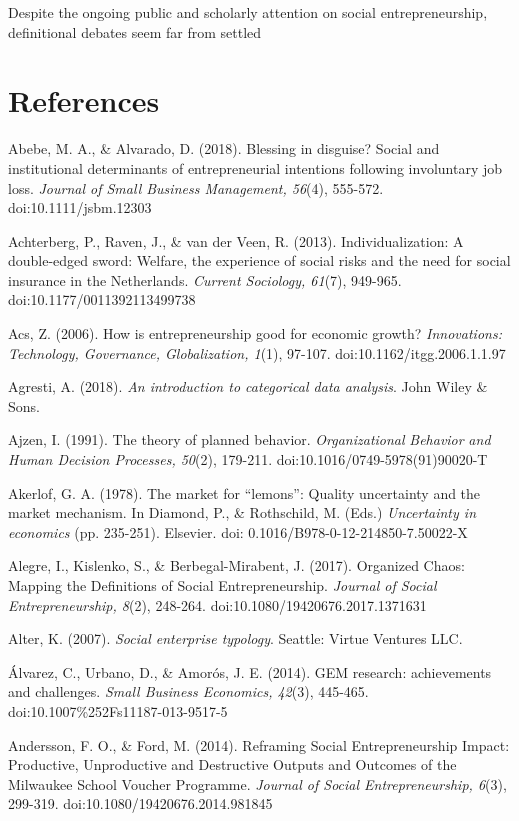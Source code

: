 \documentclass{article}
\begin{document}
  Despite the ongoing public and scholarly attention on social entrepreneurship, definitional debates seem far from settled \parencite{Saebi2019, Mair2010, Choi2014, Saebi2019, Alegre2017}



\section{References}



Abebe, M. A., \& Alvarado, D. (2018). Blessing in disguise? Social and institutional determinants of entrepreneurial intentions following involuntary job loss. \emph{Journal of Small Business Management, 56}(4), 555-572. doi:10.1111/jsbm.12303

Achterberg, P., Raven, J., \& van der Veen, R. (2013). Individualization: A double-edged sword: Welfare, the experience of social risks and the need for social insurance in the Netherlands. \emph{Current Sociology, 61}(7), 949-965. doi:10.1177/0011392113499738

Acs, Z. (2006). How is entrepreneurship good for economic growth? \emph{Innovations: Technology, Governance, Globalization, 1}(1), 97-107. doi:10.1162/itgg.2006.1.1.97

Agresti, A. (2018). \emph{An introduction to categorical data analysis}. John Wiley \& Sons.

Ajzen, I. (1991). The theory of planned behavior. \emph{Organizational }\emph{Behavior}\emph{ and Human Decision Processes, 50}(2), 179-211. doi:10.1016/0749-5978(91)90020-T

Akerlof, G. A. (1978). The market for “lemons”: Quality uncertainty and the market mechanism. In Diamond, P., \& Rothschild, M. (Eds.) \emph{Uncertainty in economics }(pp. 235-251). Elsevier. doi: 0.1016/B978-0-12-214850-7.50022-X

Alegre, I., Kislenko, S., \& Berbegal-Mirabent, J. (2017). Organized Chaos: Mapping the Definitions of Social Entrepreneurship. \emph{Journal of Social Entrepreneurship, 8}(2), 248-264. doi:10.1080/19420676.2017.1371631

Alter, K. (2007). \emph{Social enterprise typology}. Seattle: Virtue Ventures LLC. 

Álvarez, C., Urbano, D., \& Amorós, J. E. (2014). GEM research: achievements and challenges. \emph{Small Business Economics, 42}(3), 445-465. doi:10.1007\%252Fs11187-013-9517-5

Andersson, F. O., \& Ford, M. (2014). Reframing Social Entrepreneurship Impact: Productive, Unproductive and Destructive Outputs and Outcomes of the Milwaukee School Voucher Programme. \emph{Journal of Social Entrepreneurship, 6}(3), 299-319. doi:10.1080/19420676.2014.981845
\end{document}
